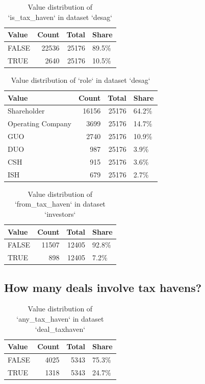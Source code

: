 \documentclass[
  letterpaper,
  DIV=11,
  numbers=noendperiod]{scrreprt}
\begin{document}
\begin{longtable}[t]{lrrl}
\caption{\label{tab:value-summary}Value distribution of `is_tax_haven` in dataset `desag`}\\
\toprule
Value & Count & Total & Share\\
\midrule
FALSE & 22536 & 25176 & 89.5\%\\
TRUE & 2640 & 25176 & 10.5\%\\
\bottomrule
\end{longtable}

\begin{longtable}[t]{lrrl}
\caption{\label{tab:value-summary}Value distribution of `role` in dataset `desag`}\\
\toprule
Value & Count & Total & Share\\
\midrule
Shareholder & 16156 & 25176 & 64.2\%\\
Operating Company & 3699 & 25176 & 14.7\%\\
GUO & 2740 & 25176 & 10.9\%\\
DUO & 987 & 25176 & 3.9\%\\
CSH & 915 & 25176 & 3.6\%\\
\addlinespace
ISH & 679 & 25176 & 2.7\%\\
\bottomrule
\end{longtable}

\begin{longtable}[t]{lrrl}
\caption{\label{tab:value-summary}Value distribution of `from_tax_haven` in dataset `investors`}\\
\toprule
Value & Count & Total & Share\\
\midrule
FALSE & 11507 & 12405 & 92.8\%\\
TRUE & 898 & 12405 & 7.2\%\\
\bottomrule
\end{longtable}

\subsection{How many deals involve tax
havens?}\label{how-many-deals-involve-tax-havens}

\begin{longtable}[t]{lrrl}
\caption{\label{tab:deals-involve-TaxHaven}Value distribution of `any_tax_haven` in dataset `deal_taxhaven`}\\
\toprule
Value & Count & Total & Share\\
\midrule
FALSE & 4025 & 5343 & 75.3\%\\
TRUE & 1318 & 5343 & 24.7\%\\
\bottomrule
\end{longtable}
\end{document}

